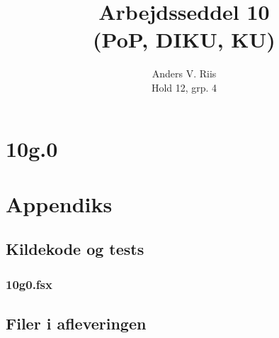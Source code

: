 \documentclass{pop}
\author{Anders V. Riis \\ Hold 12, grp. 4}
\title{Arbejdsseddel 10 \\(PoP, DIKU, KU)}
\begin{document}
\maketitle
\section*{10g.0}
\newpage 
\appendix
\section*{Appendiks}
\subsection*{Kildekode og tests}
\subsubsection*{10g0.fsx}

%
\subsection*{Filer i afleveringen}
\end{document}
